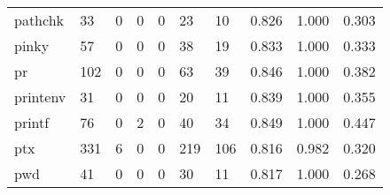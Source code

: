 \begin{longtable}{lp{1.3cm}p{1.3cm}p{1.3cm}p{1.3cm}p{1.3cm}p{1.3cm}p{1.3cm}p{1.3cm}p{1.3cm}}
pathchk   &                     33 &                                             0 &                                            0 &                                           0 &                                           23 &                                         10 &                                0.826 &                                  1.000 &                                0.303 \\
pinky     &                     57 &                                             0 &                                            0 &                                           0 &                                           38 &                                         19 &                                0.833 &                                  1.000 &                                0.333 \\
pr        &                    102 &                                             0 &                                            0 &                                           0 &                                           63 &                                         39 &                                0.846 &                                  1.000 &                                0.382 \\
printenv  &                     31 &                                             0 &                                            0 &                                           0 &                                           20 &                                         11 &                                0.839 &                                  1.000 &                                0.355 \\
printf    &                     76 &                                             0 &                                            2 &                                           0 &                                           40 &                                         34 &                                0.849 &                                  1.000 &                                0.447 \\
ptx       &                    331 &                                             6 &                                            0 &                                           0 &                                          219 &                                        106 &                                0.816 &                                  0.982 &                                0.320 \\
pwd       &                     41 &                                             0 &                                            0 &                                           0 &                                           30 &                                         11 &                                0.817 &                                  1.000 &                                0.268 \\

\end{longtable}
